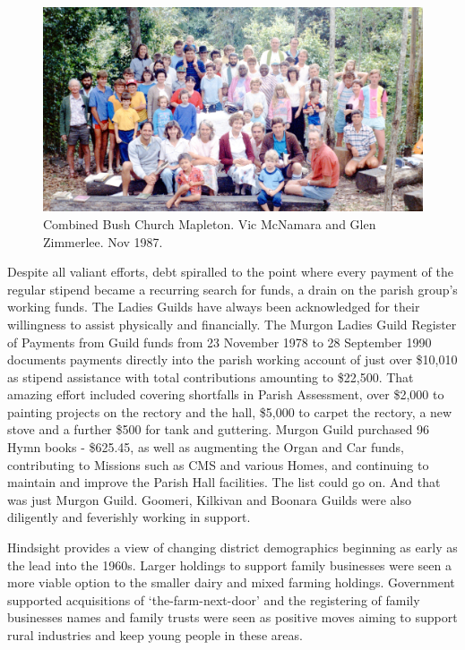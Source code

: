 \begin{figure}[!htb]
\begin{center}
\includegraphics[width=1.\textwidth,center]{../images/bushChuchMapleton1987.jpg}
\caption{Combined Bush Church Mapleton. Vic McNamara and Glen Zimmerlee. Nov 1987.}
\end{center}
\end{figure}




Despite all valiant efforts, debt spiralled to the point where every payment of the regular stipend became a recurring search for funds, a drain on the parish group's working funds. The Ladies Guilds have always been acknowledged for their willingness to assist physically and financially. The Murgon Ladies Guild Register of Payments from Guild funds from 23 November 1978 to 28 September 1990 documents payments directly into the parish working account of just over \$10,010 as stipend assistance with total contributions amounting to \$22,500. That amazing effort included covering shortfalls in Parish Assessment, over \$2,000 to painting projects on the rectory and the hall, \$5,000 to carpet the rectory, a new stove and a further \$500 for tank and guttering. Murgon Guild purchased 96 Hymn books - \$625.45, as well as augmenting the Organ and Car funds, contributing to Missions such as CMS and various Homes, and continuing to maintain and improve the Parish Hall facilities. The list could go on. And that was just Murgon Guild. Goomeri, Kilkivan and Boonara Guilds were also diligently and feverishly working in support.



Hindsight provides a view of changing district demographics beginning as early as the lead into the 1960s. Larger holdings to support family businesses were seen a more viable option to the smaller dairy and mixed farming holdings. Government supported acquisitions of `the-farm-next-door' and the registering of family businesses names and family trusts were seen as positive moves aiming to support rural industries and keep young people in these areas.



